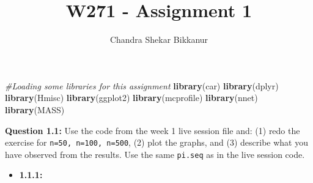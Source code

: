 \documentclass[]{article}
\title{W271 - Assignment 1}
\author{Chandra Shekar Bikkanur}
\date{}
\newenvironment{Shaded}{\begin{snugshade}}{\end{snugshade}}
\newcommand{\CommentTok}[1]{\textcolor[rgb]{0.56,0.35,0.01}{\textit{#1}}}
\newcommand{\KeywordTok}[1]{\textcolor[rgb]{0.13,0.29,0.53}{\textbf{#1}}}
\newcommand{\NormalTok}[1]{#1}
\providecommand{\tightlist}{%
  \setlength{\itemsep}{0pt}\setlength{\parskip}{0pt}}
\begin{document}
\maketitle

\begin{Shaded}
\begin{Highlighting}[]
\CommentTok{#Loading some libraries for this assignment}
\KeywordTok{library}\NormalTok{(car)}
\KeywordTok{library}\NormalTok{(dplyr)}
\KeywordTok{library}\NormalTok{(Hmisc)}
\KeywordTok{library}\NormalTok{(ggplot2)}
\KeywordTok{library}\NormalTok{(mcprofile)}
\KeywordTok{library}\NormalTok{(nnet)}
\KeywordTok{library}\NormalTok{(MASS)}
\end{Highlighting}
\end{Shaded}

\textbf{Question 1.1:} Use the code from the week 1 live session file
and: (1) redo the exercise for \texttt{n=50,\ n=100,\ n=500}, (2) plot
the graphs, and (3) describe what you have observed from the results.
Use the same \texttt{pi.seq} as in the live session code.

\begin{itemize}
\tightlist
\item
  \textbf{1.1.1:}
\end{itemize}
\end{document}
